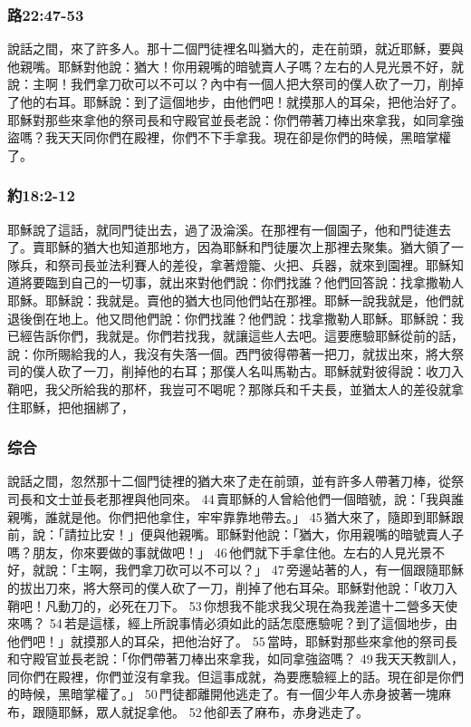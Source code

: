 \subsubsection{路22:47-53}
說話之間，來了許多人。那十二個門徒裡名叫猶大的，走在前頭，就近耶穌，要與他親嘴。耶穌對他說：猶大！你用親嘴的暗號賣人子嗎？左右的人見光景不好，就說：主啊！我們拿刀砍可以不可以？內中有一個人把大祭司的僕人砍了一刀，削掉了他的右耳。耶穌說：到了這個地步，由他們吧！就摸那人的耳朵，把他治好了。耶穌對那些來拿他的祭司長和守殿官並長老說：你們帶著刀棒出來拿我，如同拿強盜嗎？我天天同你們在殿裡，你們不下手拿我。現在卻是你們的時候，黑暗掌權了。

\subsubsection{約18:2-12}
耶穌說了這話，就同門徒出去，過了汲淪溪。在那裡有一個園子，他和門徒進去了。賣耶穌的猶大也知道那地方，因為耶穌和門徒屢次上那裡去聚集。猶大領了一隊兵，和祭司長並法利賽人的差役，拿著燈籠、火把、兵器，就來到園裡。耶穌知道將要臨到自己的一切事，就出來對他們說：你們找誰？他們回答說：找拿撒勒人耶穌。耶穌說：我就是。賣他的猶大也同他們站在那裡。耶穌一說我就是，他們就退後倒在地上。他又問他們說：你們找誰？他們說：找拿撒勒人耶穌。耶穌說：我已經告訴你們，我就是。你們若找我，就讓這些人去吧。這要應驗耶穌從前的話，說：你所賜給我的人，我沒有失落一個。西門彼得帶著一把刀，就拔出來，將大祭司的僕人砍了一刀，削掉他的右耳；那僕人名叫馬勒古。耶穌就對彼得說：收刀入鞘吧，我父所給我的那杯，我豈可不喝呢？那隊兵和千夫長，並猶太人的差役就拿住耶穌，把他捆綁了，
\subsubsection{综合}
說話之間，忽然那十二個門徒裡的猶大來了走在前頭，並有許多人帶著刀棒，從祭司長和文士並長老那裡與他同來。 44 賣耶穌的人曾給他們一個暗號，說：「我與誰親嘴，誰就是他。你們把他拿住，牢牢靠靠地帶去。」 45 猶大來了，隨即到耶穌跟前，說：「請拉比安！」便與他親嘴。耶穌對他說：「猶大，你用親嘴的暗號賣人子嗎？朋友，你來要做的事就做吧！」 46 他們就下手拿住他。左右的人見光景不好，就說：「主啊，我們拿刀砍可以不可以？」 47 旁邊站著的人，有一個跟隨耶穌的拔出刀來，將大祭司的僕人砍了一刀，削掉了他右耳朵。耶穌對他說：「收刀入鞘吧！凡動刀的，必死在刀下。 53 你想我不能求我父現在為我差遣十二營多天使來嗎？ 54 若是這樣，經上所說事情必須如此的話怎麼應驗呢？到了這個地步，由他們吧！」就摸那人的耳朵，把他治好了。 55 當時，耶穌對那些來拿他的祭司長和守殿官並長老說：「你們帶著刀棒出來拿我，如同拿強盜嗎？ 49 我天天教訓人，同你們在殿裡，你們並沒有拿我。但這事成就，為要應驗經上的話。現在卻是你們的時候，黑暗掌權了。」 50 門徒都離開他逃走了。有一個少年人赤身披著一塊麻布，跟隨耶穌，眾人就捉拿他。 52 他卻丟了麻布，赤身逃走了。


